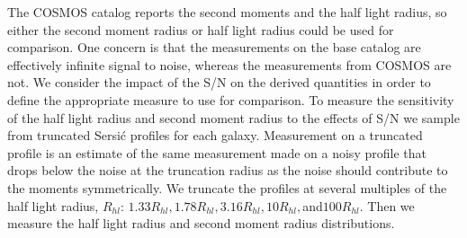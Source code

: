 \documentclass[]{article}
\begin{document}
{The COSMOS catalog reports the second moments and the 
half light radius, so either the second moment radius or half light radius could be used for comparison.  One concern is that the measurements
on the base catalog are effectively infinite signal to noise, whereas the measurements from COSMOS are not.  
We consider the impact of the S/N on the derived quantities in order to define the appropriate measure to use for comparison.
To measure the sensitivity of the half light radius and second moment radius to the effects of S/N we 
sample from truncated Sersi{\'c}
profiles for each galaxy.  Measurement on a truncated profile is an estimate of the same measurement made on a noisy profile that drops below
the noise at the truncation radius as the noise should contribute to the moments symmetrically.
We truncate the profiles at several multiples of the half light radius, $R_{hl}$: $1.33R_{hl}, 1.78R_{hl}, 3.16R_{hl}, 10R_{hl}, $and$100R_{hl}$. 
Then we measure the half light radius and second moment radius distributions.

}
\end{document}
